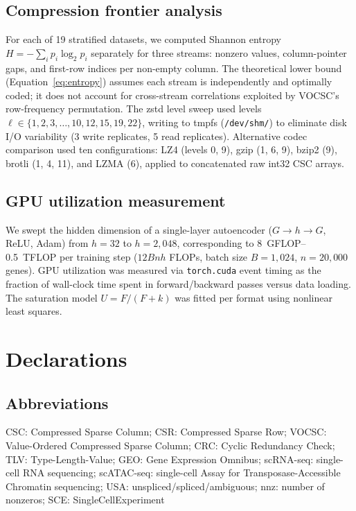 \documentclass[10pt,twocolumn,letterpaper]{article}
\begin{document}
\subsection{Compression frontier analysis}

For each of 19 stratified datasets, we computed Shannon entropy $H = -\sum_i p_i \log_2 p_i$ separately for three streams: nonzero values, column-pointer gaps, and first-row indices per non-empty column.
The theoretical lower bound (Equation~\ref{eq:entropy}) assumes each stream is independently and optimally coded; it does not account for cross-stream correlations exploited by VOCSC's row-frequency permutation.
The zstd level sweep used levels $\ell \in \{1, 2, 3, \ldots, 10, 12, 15, 19, 22\}$, writing to tmpfs (\texttt{/dev/shm/}) to eliminate disk I/O variability (3 write replicates, 5 read replicates).
Alternative codec comparison used ten configurations: LZ4 (levels 0, 9), gzip (1, 6, 9), bzip2 (9), brotli (1, 4, 11), and LZMA (6), applied to concatenated raw int32 CSC arrays.

\subsection{GPU utilization measurement}

We swept the hidden dimension of a single-layer autoencoder ($G \to h \to G$, ReLU, Adam) from $h = 32$ to $h = 2{,}048$, corresponding to 8~GFLOP--0.5~TFLOP per training step ($12Bnh$ FLOPs, batch size $B = 1{,}024$, $n = 20{,}000$ genes).
GPU utilization was measured via \texttt{torch.cuda} event timing as the fraction of wall-clock time spent in forward/backward passes versus data loading.
The saturation model $U = F / (F + k)$ was fitted per format using nonlinear least squares.


\section*{Declarations}

\subsection*{Abbreviations}
CSC: Compressed Sparse Column; CSR: Compressed Sparse Row; VOCSC: Value-Ordered Compressed Sparse Column; CRC: Cyclic Redundancy Check; TLV: Type-Length-Value; GEO: Gene Expression Omnibus; scRNA-seq: single-cell RNA sequencing; scATAC-seq: single-cell Assay for Transposase-Accessible Chromatin sequencing; USA: unspliced/spliced/ambiguous; nnz: number of nonzeros; SCE: SingleCellExperiment
\end{document}
